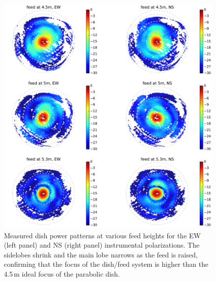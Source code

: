 \documentclass{emulateapj}
\begin{document}
\begin{figure}[t]
\centering
\includegraphics[width=6.5in]{measured_beams_and_models_maps.pdf}
\caption{Measured dish power patterns at various feed heights for the EW (left panel) and NS (right panel) instrumental polarizations. The sidelobes shrink and the main lobe narrows as the feed is raised, confirming that the focus of the dish/feed system is higher than the 4.5\,m ideal focus of the parabolic dish.}
\label{fig:measuredbeammaps}
\end{figure}
\end{document}
